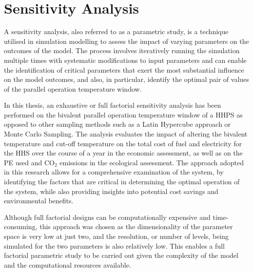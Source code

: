 \chapter{Sensitivity Analysis}\label{ch:sensitivity} 

A sensitivity analysis, also referred to as a parametric study, is a technique utilised in simulation modelling to assess the impact of varying parameters on the outcomes of the model. The process involves iteratively running the simulation multiple times with systematic modifications to input parameters and can enable the identification of critical parameters that exert the most substantial influence on the model outcomes, and also, in particular, identify the optimal pair of values of the parallel operation temperature window. 

In this thesis, an exhaustive or full factorial sensitivity analysis has been performed on the bivalent parallel operation temperature window of a \ac{HHPS} as opposed to other sampling methods such as a Latin Hypercube approach or Monte Carlo Sampling. The analysis evaluates the impact of altering the bivalent temperature and cut-off temperature on the total cost of fuel and electricity for the \ac{HHS} over the course of a year in the economic assessment, as well as on the \ac{PE} used and $\text{CO}_2$ emissions in the ecological assessment. The approach adopted in this research allows for a comprehensive examination of the system, by identifying the factors that are critical in determining the optimal operation of the system, while also providing insights into potential cost savings and environmental benefits.

Although full factorial designs can be computationally expensive and time-consuming, this approach was chosen as the dimensionality of the parameter space is very low at just two, and the resolution, or number of levels, being simulated for the two parameters is also relatively low. This enables a full factorial parametric study to be carried out given the complexity of the model and the computational resources available. 


